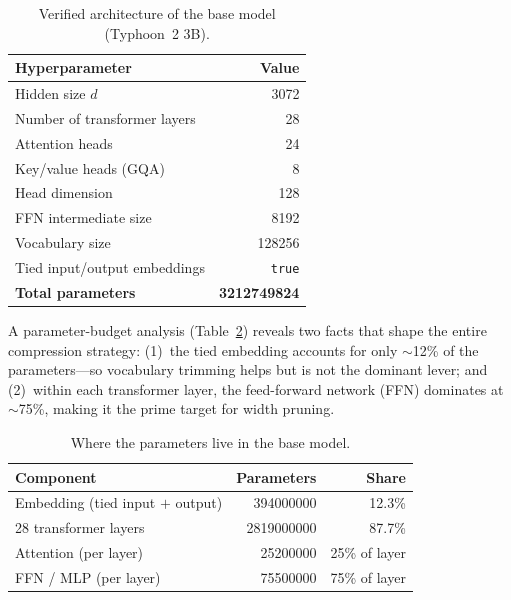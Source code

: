 \documentclass[11pt,a4paper]{article}
\begin{document}
\begin{table}[H]
  \centering
  \caption{Verified architecture of the base model (Typhoon~2 3B).}
  \label{tab:basespec}
  \begin{tabular}{lr}
    \toprule
    \textbf{Hyperparameter} & \textbf{Value} \\
    \midrule
    Hidden size $d$                       & \num{3072} \\
    Number of transformer layers          & \num{28} \\
    Attention heads                       & \num{24} \\
    Key/value heads (GQA)                 & \num{8} \\
    Head dimension                        & \num{128} \\
    FFN intermediate size                 & \num{8192} \\
    Vocabulary size                       & \num{128256} \\
    Tied input/output embeddings          & \texttt{true} \\
    \midrule
    \textbf{Total parameters}             & \textbf{\num{3212749824}} \\
    \bottomrule
  \end{tabular}
\end{table}

A parameter-budget analysis (Table~\ref{tab:budget}) reveals two facts that
shape the entire compression strategy: (1)~the tied embedding accounts for
only $\sim$12\% of the parameters---so vocabulary trimming helps but is not
the dominant lever; and (2)~within each transformer layer, the feed-forward
network (FFN) dominates at $\sim$75\%, making it the prime target for width
pruning.

\begin{table}[H]
  \centering
  \caption{Where the parameters live in the base model.}
  \label{tab:budget}
  \begin{tabular}{lrr}
    \toprule
    \textbf{Component} & \textbf{Parameters} & \textbf{Share} \\
    \midrule
    Embedding (tied input $+$ output)     & \num{394000000}  & 12.3\% \\
    28 transformer layers                 & \num{2819000000} & 87.7\% \\
    \quad Attention (per layer)           & \num{25200000}   & 25\% of layer \\
    \quad FFN / MLP (per layer)           & \num{75500000}   & 75\% of layer \\
    \bottomrule
  \end{tabular}
\end{table}
\end{document}
